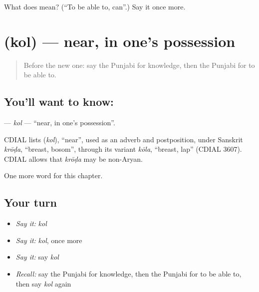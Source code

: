 \begin{tcolorbox}[breakable,colback=teal!4,colframe=teal!35!black,title={Before you move on}]
What does  mean? (\textquotedblleft{}To be able to, can\textquotedblright{}.) Say it once more.
\end{tcolorbox}
\section[\texorpdfstring{\pa{ਕੋਲ} (kol)}{ਕੋਲ (kol)}]{ (kol) — near, in one's possession}

\label{lesson:PA-C109-kol}



\begin{quote}
Before the new one: say the Punjabi for knowledge, then the Punjabi for to be able to.
\end{quote}

\subsection*{You'll want to know: }
\textbf{} — \emph{kol} — \textquotedblleft{}near, in one's possession\textquotedblright{}.

\begin{cousinweb}
CDIAL lists \textbf{} (\emph{kol}), \textquotedblleft{}near\textquotedblright{}, used as an adverb and postposition, under Sanskrit \emph{krōḍa}, \textquotedblleft{}breast, bosom\textquotedblright{}, through its variant \emph{kōla}, \textquotedblleft{}breast, lap\textquotedblright{} (CDIAL 3607). CDIAL allows that \emph{krōḍa} may be non-Aryan.
\end{cousinweb}

\begin{grammarlens}[title={What you've built}]
One more word for this chapter.
\end{grammarlens}

\subsection*{Your turn}
\begin{itemize}
\raggedright
  \item \emph{Say it:} \emph{kol}
  \item \emph{Say it:} \emph{kol}, once more
  \item \emph{Say it:} say \emph{kol}
  \item \emph{Recall:} say the Punjabi for knowledge, then the Punjabi for to be able to, then say \emph{kol} again
\end{itemize}

